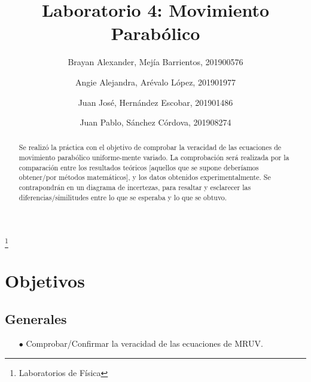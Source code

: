 \documentclass[osajnl,twocolumn,showpacs,superscriptaddress,10pt]{revtex4-1}
\begin{document}
\title{Laboratorio 4: Movimiento Parabólico}
\thanks{Laboratorios de Física}

\author{Brayan Alexander, Mejía Barrientos, 201900576}
%
\author{Angie Alejandra, Arévalo López, 201901977}
%
\author{Juan José, Hernández Escobar, 201901486}
%
\author{Juan Pablo, Sánchez Córdova, 201908274}
%



\begin{abstract}
	Se realizó la práctica con el objetivo de comprobar la veracidad de las ecuaciones de movimiento parabólico uniforme-mente variado. La comprobación será realizada por la comparación entre los resultados teóricos [aquellos que se supone deberíamos obtener/por métodos matemáticos], y los datos obtenidos experimentalmente. Se contrapondrán en un diagrama de incertezas, para resaltar y esclarecer las diferencias/similitudes entre lo que se esperaba y lo que se obtuvo.
\end{abstract}

\maketitle{}

\section{Objetivos}
\subsection{Generales}
\begin{itemize}
\item[$\bullet$] Comprobar/Confirmar la veracidad de las ecuaciones de MRUV.
\end{itemize}
\end{document}

